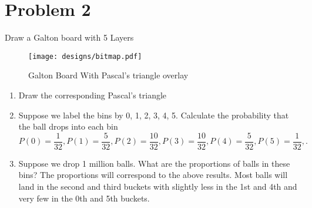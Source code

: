 \documentclass{article}
\begin{document}
    \section{Problem 2}
    Draw a Galton board with 5 Layers
    \begin{figure}[htbp]
      \centering
      \texttt{[image: designs/bitmap.pdf]}
      \caption{Galton Board With Pascal's triangle overlay}
      \label{fig:example}
    \end{figure}
    \begin{enumerate}
        \item
            Draw the corresponding Pascal's triangle

        \item Suppose we label the bins by 0, 1, 2, 3, 4, 5. Calculate the probability that the ball drops
into each bin
            \[
            P(0) = \frac{1}{32}, 
            P(1) = \frac{5}{32}, 
            P(2) = \frac{10}{32}, 
            P(3) = \frac{10}{32}, 
            P(4) = \frac{5}{32}, 
            P(5) = \frac{1}{32}, 
            .\] 
        \item Suppose we drop 1 million balls. What are the proportions of balls in these bins?
            The proportions will correspond to the above results. Most balls will land in the second
            and third buckets with slightly less in the 1st and 4th and very few in the 0th and 5th buckets.

    \end{enumerate}
\end{document}
